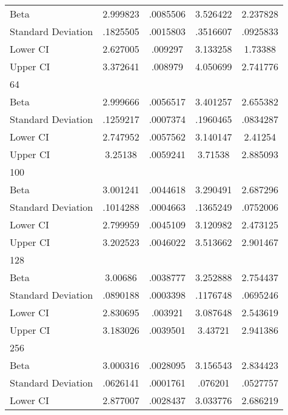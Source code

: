 {\begin{tabular}{l*{1}{cccc}}
Beta                &    2.999823&    .0085506&    3.526422&    2.237828\\
Standard Deviation  &    .1825505&    .0015803&    .3516607&    .0925833\\
Lower CI            &    2.627005&     .009297&    3.133258&     1.73388\\
Upper CI            &    3.372641&     .008979&    4.050699&    2.741776\\
\hline
64                  &            &            &            &            \\
Beta                &    2.999666&    .0056517&    3.401257&    2.655382\\
Standard Deviation  &    .1259217&    .0007374&    .1960465&    .0834287\\
Lower CI            &    2.747952&    .0057562&    3.140147&     2.41254\\
Upper CI            &     3.25138&    .0059241&     3.71538&    2.885093\\
\hline
100                 &            &            &            &            \\
Beta                &    3.001241&    .0044618&    3.290491&    2.687296\\
Standard Deviation  &    .1014288&    .0004663&    .1365249&    .0752006\\
Lower CI            &    2.799959&    .0045109&    3.120982&    2.473125\\
Upper CI            &    3.202523&    .0046022&    3.513662&    2.901467\\
\hline
128                 &            &            &            &            \\
Beta                &     3.00686&    .0038777&    3.252888&    2.754437\\
Standard Deviation  &    .0890188&    .0003398&    .1176748&    .0695246\\
Lower CI            &    2.830695&     .003921&    3.087648&    2.543619\\
Upper CI            &    3.183026&    .0039501&     3.43721&    2.941386\\
\hline
256                 &            &            &            &            \\
Beta                &    3.000316&    .0028095&    3.156543&    2.834423\\
Standard Deviation  &    .0626141&    .0001761&     .076201&    .0527757\\
Lower CI            &    2.877007&    .0028437&    3.033776&    2.686219\\

\end{tabular}}
